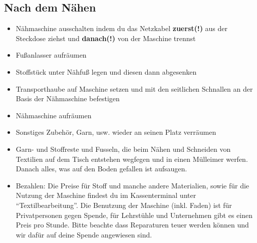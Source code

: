\documentclass{\basedir/fablab-document}
\begin{document}
\subsection{Nach dem Nähen}
\begin{itemize}
	\item Nähmaschine ausschalten indem du das Netzkabel \textbf{zuerst(!)} aus der Steckdose ziehst und \textbf{danach(!)} von der Maschine trennst
	\item Fußanlasser aufräumen
	\item Stoffstück unter Nähfuß legen und diesen dann abgesenken
	\item Transporthaube auf Maschine setzen und mit den seitlichen Schnallen an der Basis der Nähmaschine befestigen
	\item Nähmaschine aufräumen
	\item Sonstiges Zubehör, Garn, usw. wieder an seinen Platz verräumen
	\item Garn- und Stoffreste und Fusseln, die beim Nähen und Schneiden von Textilien auf dem Tisch entstehen wegfegen und in einen Mülleimer werfen. Danach alles, was auf den Boden gefallen ist aufsaugen.
	\item Bezahlen: Die Preise für Stoff und manche andere Materialien, sowie für die Nutzung der Maschine findest du im Kassenterminal unter \enquote{Textilbearbeitung}. Die Benutzung der Maschine (inkl. Faden) ist für Privatpersonen gegen Spende, für Lehrstühle und Unternehmen gibt es einen Preis pro Stunde. Bitte beachte dass Reparaturen teuer werden können und wir dafür auf deine Spende angewiesen sind.
\end{itemize}

\pagebreak
\end{document}
